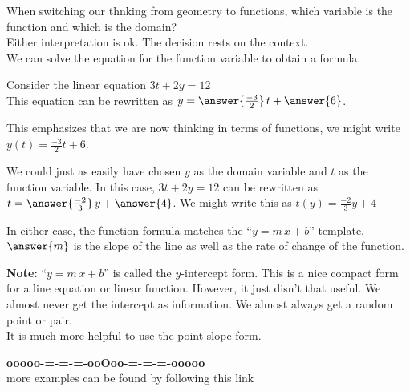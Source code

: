 \documentclass{ximera}
\begin{document}
\begin{explanation}
When switching our thnking from geometry to functions, which variable is the function and which is the domain? \\

Either interpretation is ok.  The decision rests on the context.  \\

We can solve the equation for the function variable to obtain a formula.



Consider the linear equation $3 t + 2 y = 12$ \\

This equation can be rewritten as $y = \answer{\frac{-3}{2}} \, t + \answer{6}$.

This emphasizes that we are now thinking in terms of functions, we might write $y(t) = \tfrac{-3}{2} t + 6$.




We could just as easily have chosen $y$ as the domain variable and $t$ as the function variable.  In this case, $3 t + 2 y = 12$ can be rewritten as $t = \answer{\frac{-2}{3}} \, y + \answer{4}$.  We might write this as $t(y) = \tfrac{-2}{3} y + 4$




In either case, the function formula matches the ``$y = m \, x + b$'' template.  $\answer{m}$ is the slope of the line as well as the rate of change of the function.


\end{explanation}




\textbf{Note:}  ``$y = m \, x + b$'' is called the $y$-intercept form.  This is a nice compact form for a line equation or linear function.  However, it just disn't that useful.  We almost never get the intercept as information.  We almost always get a random point or pair.\\

It is much more helpful to use the point-slope form.





















\begin{onlineOnly}
\begin{center}
\textbf{\textcolor{green!50!black}{ooooo-=-=-=-ooOoo-=-=-=-ooooo}} \\

more examples can be found by following this link\\ 

\end{center}
\end{onlineOnly}
\end{document}
